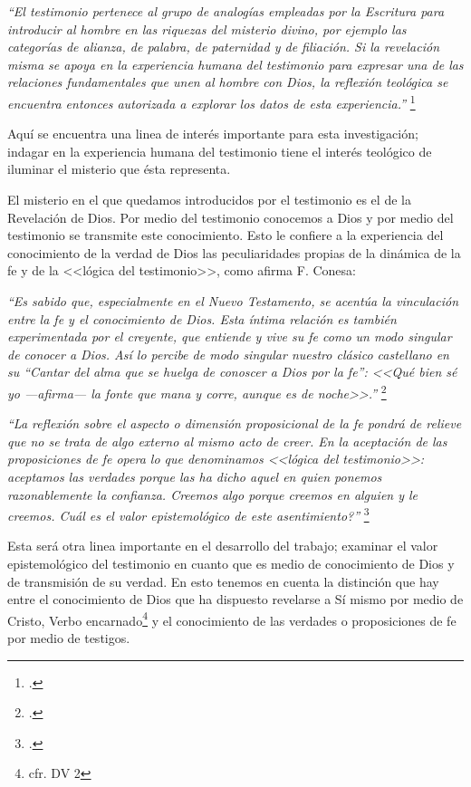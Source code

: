 \documentclass[12pt]{article}
\begin{document}
{\emph{``El testimonio pertenece al grupo de analogías empleadas por la Escritura para introducir al hombre en las riquezas del misterio divino, por ejemplo las categorías de alianza, de palabra, de paternidad y de filiación. Si la revelación misma se apoya en la experiencia humana del testimonio para expresar una de las relaciones fundamentales que unen al hombre con Dios, la reflexión teológica se encuentra entonces autorizada a explorar los datos de esta experiencia.''
}
\footcite[p.~1523]{dicctf}

Aquí se encuentra una linea de interés importante para esta investigación; indagar en la experiencia humana del testimonio tiene el interés teológico de iluminar el misterio que ésta representa. 

El misterio en el que quedamos introducidos por el testimonio es el de la Revelación de Dios. Por medio del testimonio conocemos a Dios y por medio del testimonio se transmite este conocimiento. Esto le confiere a la experiencia del conocimiento de la verdad de Dios las peculiaridades propias de la dinámica de la fe y de la <<lógica del testimonio>>, como afirma F. Conesa:

\emph{
``Es sabido que, especialmente en el Nuevo Testamento, se acentúa la vinculación entre la fe y el conocimiento de Dios. Esta íntima relación es también experimentada por el creyente, que entiende y vive su fe como un modo singular de conocer a Dios. Así lo percibe de modo singular nuestro clásico castellano en su ``Cantar del alma que se huelga de conoscer a Dios por la fe'': <<Qué bien sé yo ---afirma--- la fonte que mana y corre, aunque es de noche>>.''}
\footcite[p.~15]{cyc}


\emph{
``La reflexión sobre el aspecto o dimensión proposicional de la fe pondrá de relieve que no se trata de algo externo al mismo acto de creer. En la aceptación de las proposiciones de fe opera lo que denominamos <<lógica del testimonio>>: aceptamos las verdades porque las ha dicho aquel en quien ponemos razonablemente la confianza. Creemos algo porque creemos en alguien y le creemos. \textquestiondown Cuál es el valor epistemológico de este asentimiento?''}
\footcite[p.483]{feylogicaconesa}

Esta será otra linea importante en el desarrollo del trabajo; examinar el valor epistemológico del testimonio en cuanto que es medio de conocimiento de Dios y de transmisión de su verdad. En esto tenemos en cuenta la distinción que hay entre el conocimiento de Dios que ha dispuesto revelarse a Sí mismo por medio de Cristo, Verbo encarnado\footnote{cfr. DV 2} y el conocimiento de las verdades o proposiciones de fe por medio de testigos. 


}
\end{document}
